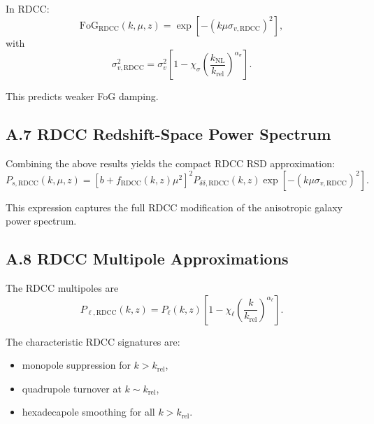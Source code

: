 \documentclass[11pt,a4paper]{article}
\begin{document}
In RDCC:
\begin{equation}
\mathrm{FoG}_{\mathrm{RDCC}}(k,\mu,z)
=
\exp\!\left[
- (k\mu\sigma_{v,\mathrm{RDCC}})^{2}
\right],
\end{equation}
with
\begin{equation}
\sigma_{v,\mathrm{RDCC}}^{2}
=
\sigma_{v}^{2}
\left[
1
-
\chi_{\sigma}
\left(
\frac{k_{\mathrm{NL}}}{k_{\mathrm{rel}}}
\right)^{\alpha_{\sigma}}
\right].
\end{equation}

This predicts weaker FoG damping.

\subsection*{A.7 RDCC Redshift-Space Power Spectrum}

Combining the above results yields the compact RDCC RSD approximation:
\begin{equation}
P_{s,\mathrm{RDCC}}(k,\mu,z)
=
\left[
b + f_{\mathrm{RDCC}}(k,z)\mu^{2}
\right]^{2}
P_{\delta\delta,\mathrm{RDCC}}(k,z)
\exp\!\left[
- (k\mu\sigma_{v,\mathrm{RDCC}})^{2}
\right].
\end{equation}

This expression captures the full RDCC modification of the anisotropic galaxy power spectrum.

\subsection*{A.8 RDCC Multipole Approximations}

The RDCC multipoles are
\begin{equation}
P_{\ell,\mathrm{RDCC}}(k,z)
=
P_{\ell}(k,z)
\left[
1
-
\chi_{\ell}
\left(
\frac{k}{k_{\mathrm{rel}}}
\right)^{\alpha_{\ell}}
\right].
\end{equation}

The characteristic RDCC signatures are:
\begin{itemize}
\item monopole suppression for $k > k_{\mathrm{rel}}$,
\item quadrupole turnover at $k \sim k_{\mathrm{rel}}$,
\item hexadecapole smoothing for all $k > k_{\mathrm{rel}}$.
\end{itemize}

\end{document}
